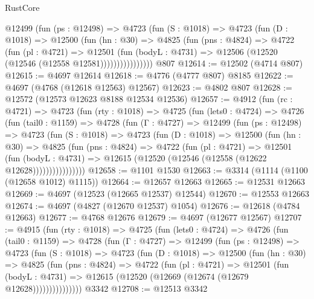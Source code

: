 \begin{lexlean}{RustCore}
\begin{coremodule}
              @12499
                (fun (ps : @12498) =>
                @4723
                  (fun (S : @1018) =>
                  @4723
                    (fun (D : @1018) =>
                    @12500
                      (fun (hn : @30) =>
                      @4825
                        (fun (pns : @4824) =>
                        @4722
                          (fun (pl : @4721) =>
                          @12501
                            (fun (bodyL : @4731) =>
                            @12506 (@12520 (@12546 (@12558 @12581))))))))))))))))
    @807
@12614 := @12502 (@4714 @807)
@12615 := @4697 @12614
@12618 := @4776 (@4777 @807) @8185
@12622 := @4697 (@4768 (@12618 @12563) @12567)
@12623 := @4802 @807
@12628 := @12572 (@12573 @12623 @8188 @12534 @12536)
@12657 := @4912
    (fun (rc : @4721) =>
    @4723
      (fun (rty : @1018) =>
      @4725
        (fun (lets0 : @4724) =>
        @4726
          (fun (tail0 : @1159) =>
          @4728
            (fun (Γ : @4727) =>
            @12499
              (fun (ps : @12498) =>
              @4723
                (fun (S : @1018) =>
                @4723
                  (fun (D : @1018) =>
                  @12500
                    (fun (hn : @30) =>
                    @4825
                      (fun (pns : @4824) =>
                      @4722
                        (fun (pl : @4721) =>
                        @12501
                          (fun (bodyL : @4731) =>
                          @12615 (@12520 (@12546 (@12558 (@12622 @12628))))))))))))))))
@12658 := @1101 @1530
@12663 := @3314 (@1114 (@1100 (@12658 @1012) @1115))
@12664 := @12657 @12663
@12665 := @12531 @12663
@12669 := @4697 (@12523 (@12665 @12537) @12544)
@12670 := @12553 @12663
@12674 := @4697 (@4827 (@12670 @12537) @1054)
@12676 := @12618 (@4784 @12663)
@12677 := @4768 @12676
@12679 := @4697 (@12677 @12567)
@12707 := @4915
    (fun (rty : @1018) =>
    @4725
      (fun (lets0 : @4724) =>
      @4726
        (fun (tail0 : @1159) =>
        @4728
          (fun (Γ : @4727) =>
          @12499
            (fun (ps : @12498) =>
            @4723
              (fun (S : @1018) =>
              @4723
                (fun (D : @1018) =>
                @12500
                  (fun (hn : @30) =>
                  @4825
                    (fun (pns : @4824) =>
                    @4722
                      (fun (pl : @4721) =>
                      @12501
                        (fun (bodyL : @4731) =>
                        @12615 (@12520 (@12669 (@12674 (@12679 @12628)))))))))))))))
    @3342
@12708 := @12513 @3342

\end{coremodule}
\end{lexlean}
